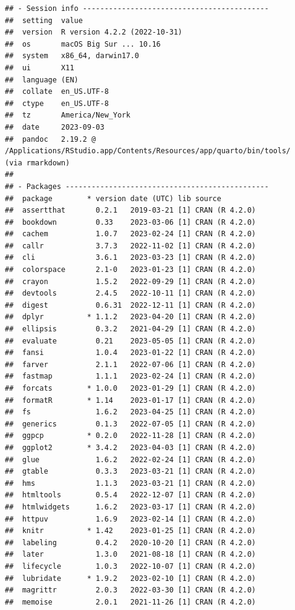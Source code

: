 \documentclass[print]{nuthesis}
\begin{document}
\begin{verbatim}
## - Session info -------------------------------------------
##  setting  value
##  version  R version 4.2.2 (2022-10-31)
##  os       macOS Big Sur ... 10.16
##  system   x86_64, darwin17.0
##  ui       X11
##  language (EN)
##  collate  en_US.UTF-8
##  ctype    en_US.UTF-8
##  tz       America/New_York
##  date     2023-09-03
##  pandoc   2.19.2 @ /Applications/RStudio.app/Contents/Resources/app/quarto/bin/tools/ (via rmarkdown)
## 
## - Packages -----------------------------------------------
##  package        * version date (UTC) lib source
##  assertthat       0.2.1   2019-03-21 [1] CRAN (R 4.2.0)
##  bookdown         0.33    2023-03-06 [1] CRAN (R 4.2.0)
##  cachem           1.0.7   2023-02-24 [1] CRAN (R 4.2.0)
##  callr            3.7.3   2022-11-02 [1] CRAN (R 4.2.0)
##  cli              3.6.1   2023-03-23 [1] CRAN (R 4.2.0)
##  colorspace       2.1-0   2023-01-23 [1] CRAN (R 4.2.0)
##  crayon           1.5.2   2022-09-29 [1] CRAN (R 4.2.0)
##  devtools         2.4.5   2022-10-11 [1] CRAN (R 4.2.0)
##  digest           0.6.31  2022-12-11 [1] CRAN (R 4.2.0)
##  dplyr          * 1.1.2   2023-04-20 [1] CRAN (R 4.2.0)
##  ellipsis         0.3.2   2021-04-29 [1] CRAN (R 4.2.0)
##  evaluate         0.21    2023-05-05 [1] CRAN (R 4.2.0)
##  fansi            1.0.4   2023-01-22 [1] CRAN (R 4.2.0)
##  farver           2.1.1   2022-07-06 [1] CRAN (R 4.2.0)
##  fastmap          1.1.1   2023-02-24 [1] CRAN (R 4.2.0)
##  forcats        * 1.0.0   2023-01-29 [1] CRAN (R 4.2.0)
##  formatR        * 1.14    2023-01-17 [1] CRAN (R 4.2.0)
##  fs               1.6.2   2023-04-25 [1] CRAN (R 4.2.0)
##  generics         0.1.3   2022-07-05 [1] CRAN (R 4.2.0)
##  ggpcp          * 0.2.0   2022-11-28 [1] CRAN (R 4.2.0)
##  ggplot2        * 3.4.2   2023-04-03 [1] CRAN (R 4.2.0)
##  glue             1.6.2   2022-02-24 [1] CRAN (R 4.2.0)
##  gtable           0.3.3   2023-03-21 [1] CRAN (R 4.2.0)
##  hms              1.1.3   2023-03-21 [1] CRAN (R 4.2.0)
##  htmltools        0.5.4   2022-12-07 [1] CRAN (R 4.2.0)
##  htmlwidgets      1.6.2   2023-03-17 [1] CRAN (R 4.2.0)
##  httpuv           1.6.9   2023-02-14 [1] CRAN (R 4.2.0)
##  knitr          * 1.42    2023-01-25 [1] CRAN (R 4.2.0)
##  labeling         0.4.2   2020-10-20 [1] CRAN (R 4.2.0)
##  later            1.3.0   2021-08-18 [1] CRAN (R 4.2.0)
##  lifecycle        1.0.3   2022-10-07 [1] CRAN (R 4.2.0)
##  lubridate      * 1.9.2   2023-02-10 [1] CRAN (R 4.2.0)
##  magrittr         2.0.3   2022-03-30 [1] CRAN (R 4.2.0)
##  memoise          2.0.1   2021-11-26 [1] CRAN (R 4.2.0)

\end{verbatim}
\end{document}
